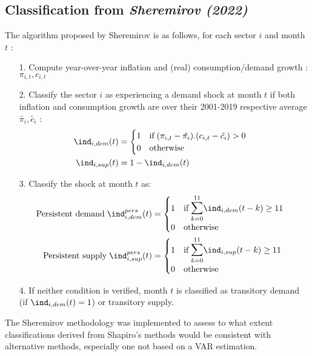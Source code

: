\subsection{Classification from \textit{Sheremirov (2022)}}

The algorithm proposed by Sheremirov is as follows, for each sector $i$ and month $t$ :
\begin{itemize}
    \item[1.] Compute year-over-year inflation and (real) consumption/demand growth : $\pi_{i,t},c_{i,t}$
    \item[2.] Classify the sector $i$ as experiencing a demand shock at month $t$ if both inflation and consumption growth are over their 2001-2019 respective average $\tilde{\pi_i},\tilde{c_i}$ : 
    \begin{align*}
        \ind_{i,dem}(t) &= \begin{cases} 1 \quad \textrm{if} \; (\pi_{i,t}-\tilde{\pi_i}).(c_{i,t}-\tilde{c_i})>0 \\ 0 \quad \textrm{otherwise} \end{cases} \\ 
        \ind_{i,sup}(t) &= 1 - \ind_{i,dem}(t)
    \end{align*}
    \item[3.] Classify the shock at month $t$ as:
    \begin{align*}
        \textrm{Persistent demand} \; \ind_{i,dem}^{pers}(t) &= \begin{cases} 1 \quad \textrm{if} \; \mathlarger{\mathlarger{\sum}}_{k=0}^{11} \ind_{i,dem}(t-k) \geq 11 \\ 0 \quad \textrm{otherwise} \end{cases} \\ 
        \textrm{Persistent supply} \; \ind_{i,sup}^{pers}(t) &= \begin{cases} 1 \quad \textrm{if} \; \mathlarger{\mathlarger{\sum}}_{k=0}^{11} \ind_{i,sup}(t-k) \geq 11 \\ 0 \quad \textrm{otherwise} \end{cases} \\ 
    \end{align*}
    \item[4.] If neither condition is verified, month $t$ is classified as transitory demand (if $\ind_{i,dem}(t)=1$) or transitory supply.
\end{itemize}
\quad The Sheremirov methodology was implemented to assess to what extent classifications derived from Shapiro's methods would be consistent with alternative methods, especially one not based on a VAR estimation. 
